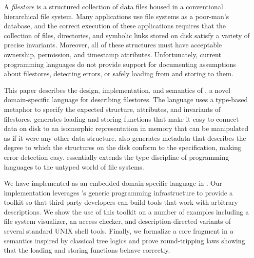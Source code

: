A {\em filestore} is a structured collection of data files housed in a
conventional hierarchical file system. Many applications use file
systems as a poor-man's database, and the correct execution of these
applications requires that the collection of files, directories, and
symbolic links stored on disk satisfy a variety of precise
invariants. Moreover, all of these structures must have acceptable
ownership, permission, and timestamp attributes. Unfortunately,
current programming languages do not provide support for documenting
assumptions about filestores, detecting errors, or safely loading from
and storing to them.

This paper describes the design, implementation, and semantics of
\forest{}, a novel domain-specific language for describing
filestores. The language uses a type-based metaphor to specify the
expected structure, attributes, and invariants of filestores.
\forest{} generates loading and storing functions that make it easy to
connect data on disk to an isomorphic representation in memory that
can be manipulated as if it were any other data structure.  \forest{}
also generates metadata that describes the degree to which the
structures on the disk conform to the specification, making error
detection easy. \forest{} essentially extends the type discipline of
programming languages to the untyped world of file systems.

We have implemented \forest{} as an embedded domain-specific language
in \haskell{}. Our implementation leverages \haskell{}'s 
generic programming infrastructure to provide a toolkit so that
third-party developers can build tools that work with
arbitrary \forest{} descriptions.  We show the use of this toolkit on
a number of examples including a file system visualizer, an access
checker, and description-directed variants of several standard UNIX
shell tools. Finally, we formalize a core fragment \forest{} in a
semantics inspired by classical tree logics and prove round-tripping
laws showing that the loading and storing functions behave correctly.
